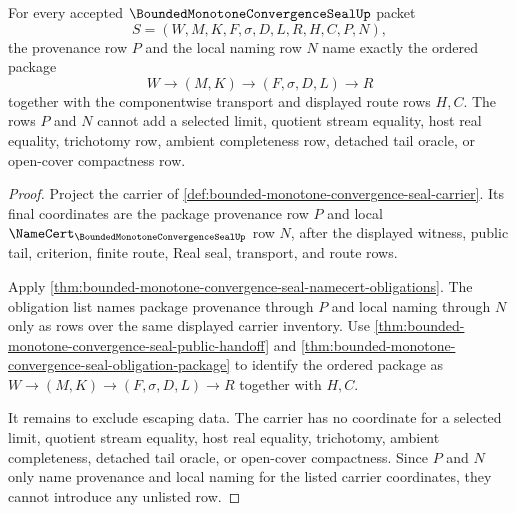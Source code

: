 \begin{theorem}
\label{thm:bounded-monotone-convergence-seal-provenance-local-naming}
For every accepted $\BoundedMonotoneConvergenceSealUp$ packet
$$
S=(W,M,K,F,\sigma,D,L,R,H,C,P,N),
$$
the provenance row $P$ and the local naming row $N$ name exactly the ordered package
$$
W \to (M,K) \to (F,\sigma,D,L) \to R
$$
together with the componentwise transport and displayed route rows $H,C$. The rows $P$ and $N$ cannot add a selected limit, quotient stream equality, host real equality, trichotomy row, ambient completeness row, detached tail oracle, or open-cover compactness row.
\end{theorem}
\begin{proof}
Project the carrier of \autoref{def:bounded-monotone-convergence-seal-carrier}. Its final coordinates are the package provenance row $P$ and local $\NameCert_{\BoundedMonotoneConvergenceSealUp}$ row $N$, after the displayed witness, public tail, criterion, finite route, Real seal, transport, and route rows.

Apply \autoref{thm:bounded-monotone-convergence-seal-namecert-obligations}. The obligation list names package provenance through $P$ and local naming through $N$ only as rows over the same displayed carrier inventory. Use \autoref{thm:bounded-monotone-convergence-seal-public-handoff} and \autoref{thm:bounded-monotone-convergence-seal-obligation-package} to identify the ordered package as $W \to (M,K) \to (F,\sigma,D,L) \to R$ together with $H,C$.

It remains to exclude escaping data. The carrier has no coordinate for a selected limit, quotient stream equality, host real equality, trichotomy, ambient completeness, detached tail oracle, or open-cover compactness. Since $P$ and $N$ only name provenance and local naming for the listed carrier coordinates, they cannot introduce any unlisted row.
\end{proof}

